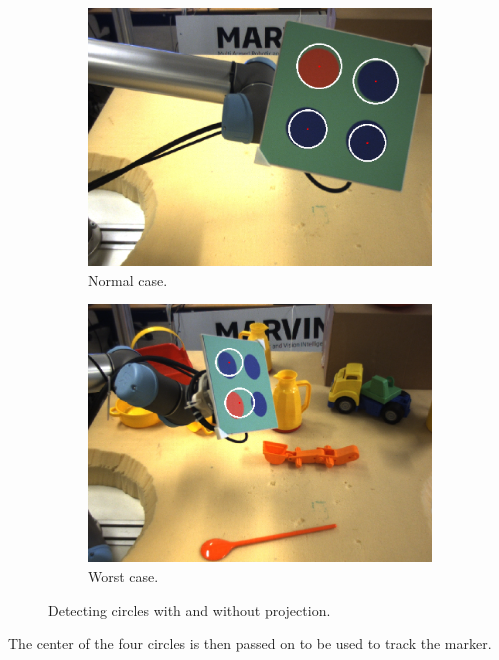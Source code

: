 \begin{figure}[h]
 \centering
 \begin{subfigure}{\exampleWidth}
 \includegraphics[width=\linewidth]{graphics/best_case_hough_circle}
 \caption{Normal case.}
 \end{subfigure}
 \begin{subfigure}{\exampleWidth}
 \includegraphics[width=\linewidth]{graphics/worst_case_hough_circle}
 \caption{Worst case.}
 \label{fig:circle_detection_worstcase}
 \end{subfigure}
 \caption{Detecting circles with and without projection.}
 \label{fig:circle_detection}
\end{figure}


The center of the four circles is then passed on to be used to track the marker.

